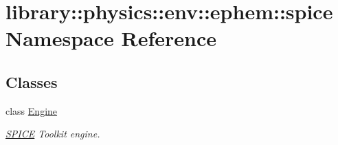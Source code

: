 \hypertarget{namespacelibrary_1_1physics_1_1env_1_1ephem_1_1spice}{}\section{library\+:\+:physics\+:\+:env\+:\+:ephem\+:\+:spice Namespace Reference}
\label{namespacelibrary_1_1physics_1_1env_1_1ephem_1_1spice}
\subsection*{Classes}
\begin{DoxyCompactItemize}
\item 
class \hyperlink{classlibrary_1_1physics_1_1env_1_1ephem_1_1spice_1_1_engine}{Engine}
\begin{DoxyCompactList}\small\item\em \hyperlink{classlibrary_1_1physics_1_1env_1_1ephem_1_1_s_p_i_c_e}{S\+P\+I\+CE} Toolkit engine. \end{DoxyCompactList}\end{DoxyCompactItemize}
